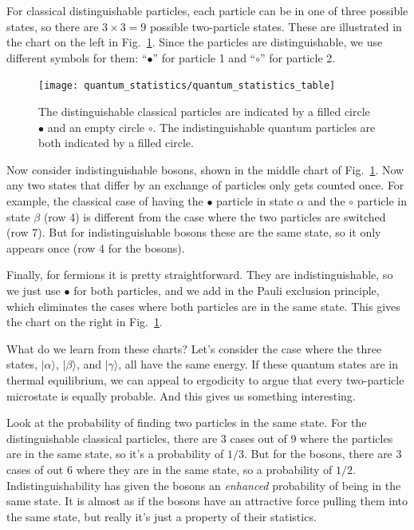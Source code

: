 For classical distinguishable particles, each particle can be in one
of three possible states, so there are $3\times 3=9$ possible
two-particle states.  These are illustrated in the chart on the left
in Fig.~\ref{fig:quantum_statistics}.  Since the particles are
distinguishable, we use different symbols for them: ``$\bullet$''
for particle 1 and ``$\circ$'' for particle 2.

\begin{figure}[h]
\begin{center}
\texttt{[image: quantum\_statistics/quantum\_statistics\_table]}
\caption{The distinguishable classical particles are indicated by a
  filled circle $\bullet$ and an empty circle $\circ$.  The
  indistinguishable quantum particles are both indicated by a filled
  circle.}
\label{fig:quantum_statistics}
\end{center}
\end{figure}

Now consider indistinguishable bosons, shown in the middle chart of
Fig.~\ref{fig:quantum_statistics}.  Now any two states that differ by
an exchange of particles only gets counted once.  For example, the
classical case of having the $\bullet$ particle in state $\alpha$ and
the $\circ$ particle in state $\beta$ (row 4) is different from the
case where the two particles are switched (row 7).  But for
indistinguishable bosons these are the same state, so it only appears
once (row 4 for the bosons).

Finally, for fermions it is pretty straightforward.  They are
indistinguishable, so we just use $\bullet$ for both particles, and we
add in the Pauli exclusion principle, which eliminates the cases where
both particles are in the same state.  This gives the chart on the
right in Fig.~\ref{fig:quantum_statistics}.

What do we learn from these charts?  Let's consider the case where the
three states, $|\alpha\rangle$, $|\beta\rangle$, and $|\gamma\rangle$,
all have the same energy.  If these quantum states are in thermal
equilibrium, we can appeal to ergodicity to argue that every
two-particle microstate is equally probable.  And this gives us
something interesting.

Look at the probability of finding two particles in the same state.
For the distinguishable classical particles, there are 3 cases out of
9 where the particles are in the same state, so it's a probability of
$1/3$.  But for the bosons, there are 3 cases of out 6 where they are
in the same state, so a probability of $1/2$.  Indistinguishability
has given the bosons an \textit{enhanced} probability of being in the
same state.  It is almost as if the bosons have an attractive force
pulling them into the same state, but really it's just a property of
their statistics.

